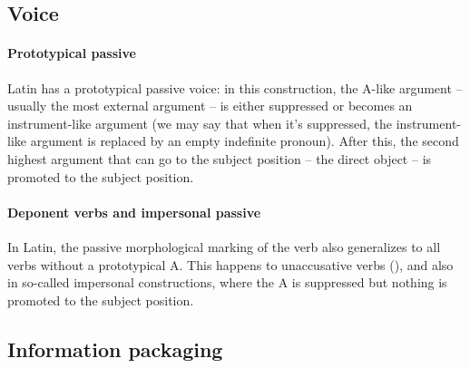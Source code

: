 \documentclass[a4paper, oneside, 12pt]{report}
\begin{document}
\subsection{Voice}\label{sec:grammatical.clause.voice}

\paragraph*{Prototypical passive}
Latin has a prototypical passive voice:
in this construction, the A-like argument -- usually the most external argument --
is either suppressed or becomes an instrument-like argument
(we may say that when it's suppressed,
the instrument-like argument is replaced by an empty indefinite pronoun).
After this, the second highest argument that can go to the subject position
-- the direct object --
is promoted to the subject position.

\paragraph*{Deponent verbs and impersonal passive}
In Latin, the passive morphological marking of the verb
also generalizes to all verbs without a prototypical A.
This happens to unaccusative verbs
(),
and also in so-called impersonal constructions,
where the A is suppressed but nothing is promoted to the subject position.

\subsection{Information packaging}\label{sec:grammatical.clause.information}
\end{document}
